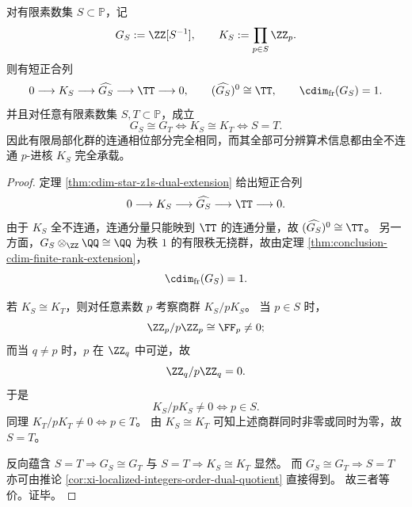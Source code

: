\begin{theorem}\label{thm:xi-localized-integers-padic-kernel-rigidity}
对有限素数集 \(S\subset\mathbb P\)，记
\[
G_S:=\ZZ[S^{-1}],
\qquad
K_S:=\prod_{p\in S}\ZZ_p.
\]
则有短正合列
\[
0\longrightarrow K_S\longrightarrow \widehat{G_S}\longrightarrow \TT\longrightarrow 0,
\qquad
(\widehat{G_S})^0\cong \TT,
\qquad
\cdim_{\mathrm{fr}}(G_S)=1.
\]
并且对任意有限素数集 \(S,T\subset\mathbb P\)，成立
\[
G_S\cong G_T
\iff
K_S\cong K_T
\iff
S=T.
\]
因此有限局部化群的连通相位部分完全相同，而其全部可分辨算术信息都由全不连通
\(p\)-进核 \(K_S\) 完全承载。
\end{theorem}
\begin{proof}
定理 \ref{thm:cdim-star-z1s-dual-extension} 给出短正合列
\[
0\longrightarrow K_S\longrightarrow \widehat{G_S}\longrightarrow \TT\longrightarrow 0.
\]
由于 \(K_S\) 全不连通，连通分量只能映到 \(\TT\) 的连通分量，故
\(
(\widehat{G_S})^0\cong \TT
\)。
另一方面，\(G_S\otimes_{\ZZ}\QQ\cong \QQ\) 为秩 \(1\) 的有限秩无挠群，故由定理
\ref{thm:conclusion-cdim-finite-rank-extension}，
\[
\cdim_{\mathrm{fr}}(G_S)=1.
\]

若 \(K_S\cong K_T\)，则对任意素数 \(p\) 考察商群 \(K_S/pK_S\)。
当 \(p\in S\) 时，
\[
\ZZ_p/p\ZZ_p\cong \FF_p\neq 0;
\]
而当 \(q\neq p\) 时，\(p\) 在 \(\ZZ_q\) 中可逆，故
\[
\ZZ_q/p\ZZ_q=0.
\]
于是
\[
K_S/pK_S\neq 0
\iff
p\in S.
\]
同理
\(
K_T/pK_T\neq 0\iff p\in T
\)。
由 \(K_S\cong K_T\) 可知上述商群同时非零或同时为零，故 \(S=T\)。

反向蕴含 \(S=T\Rightarrow G_S\cong G_T\) 与 \(S=T\Rightarrow K_S\cong K_T\) 显然。
而 \(G_S\cong G_T\Rightarrow S=T\) 亦可由推论
\ref{cor:xi-localized-integers-order-dual-quotient} 直接得到。
故三者等价。证毕。
\end{proof}

